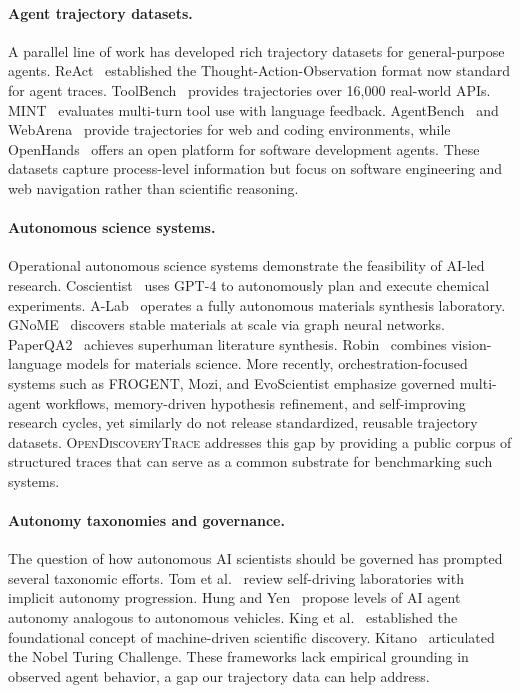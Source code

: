 \documentclass{article}
\newcommand{\dataset}{\textsc{OpenDiscoveryTrace}\xspace}
\begin{document}
\paragraph{Agent trajectory datasets.}
A parallel line of work has developed rich trajectory datasets for general-purpose agents. ReAct~\citep{yao2023react} established the Thought-Action-Observation format now standard for agent traces. ToolBench~\citep{qin2024toolbench} provides trajectories over 16,000 real-world APIs. MINT~\citep{wang2024mint} evaluates multi-turn tool use with language feedback. AgentBench~\citep{liu2024agentbench} and WebArena~\citep{zhou2024webarena} provide trajectories for web and coding environments, while OpenHands~\citep{wang2025openhands} offers an open platform for software development agents. These datasets capture process-level information but focus on software engineering and web navigation rather than scientific reasoning.

\paragraph{Autonomous science systems.}
Operational autonomous science systems demonstrate the feasibility of AI-led research. Coscientist~\citep{boiko2023coscientist} uses GPT-4 to autonomously plan and execute chemical experiments. A-Lab~\citep{szymanski2023alab} operates a fully autonomous materials synthesis laboratory. GNoME~\citep{merchant2023gnome} discovers stable materials at scale via graph neural networks. PaperQA2~\citep{skarlinski2024paperqa2} achieves superhuman literature synthesis. Robin~\citep{ghareeb2025robin} combines vision-language models for materials science. More recently, orchestration-focused systems such as FROGENT, Mozi, and EvoScientist emphasize governed multi-agent workflows, memory-driven hypothesis refinement, and self-improving research cycles, yet similarly do not release standardized, reusable trajectory datasets. \dataset addresses this gap by providing a public corpus of structured traces that can serve as a common substrate for benchmarking such systems.

\paragraph{Autonomy taxonomies and governance.}
The question of how autonomous AI scientists should be governed has prompted several taxonomic efforts. Tom et al.~\citep{tom2024selfdriving} review self-driving laboratories with implicit autonomy progression. Hung and Yen~\citep{hung2024levels} propose levels of AI agent autonomy analogous to autonomous vehicles. King et al.~\citep{king2009automation} established the foundational concept of machine-driven scientific discovery. Kitano~\citep{kitano2021nobel} articulated the Nobel Turing Challenge. These frameworks lack empirical grounding in observed agent behavior, a gap our trajectory data can help address.
\end{document}
